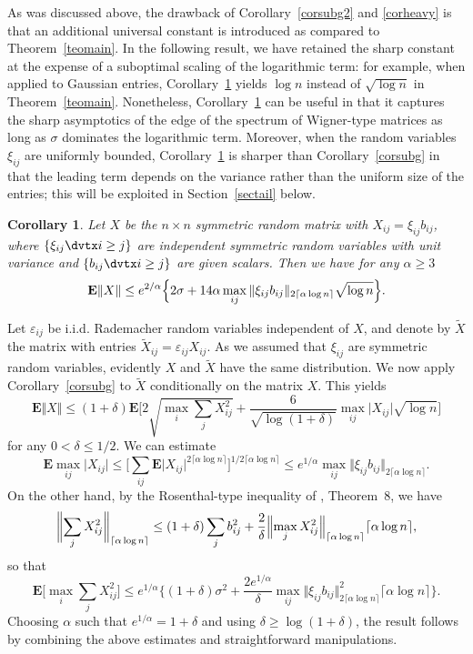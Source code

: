 \documentclass[aop,MSNbibl,dvips]{arximspdf}
\newcommand{\rrvert}{\vert}
\newcommand{\rrVert}{\Vert}
\newcommand{\llvert}{\vert}
\newcommand{\llVert}{\Vert}
\newtheorem{cor}[teo]{Corollary}
\newcommand{\EE}{\mathbf{E}}
\begin{document}
As was discussed above, the drawback of Corollary~\ref{corsubg2} and
\ref{corheavy} is that an additional universal constant is introduced as
compared to Theorem~\ref{teomain}. In the following result, we have
retained the sharp constant at the expense of a suboptimal scaling of the
logarithmic term: for example, when applied to Gaussian entries,
Corollary~\ref{corsymm} yields $\log n$ instead of $\sqrt{\log n}$ in
Theorem~\ref{teomain}. Nonetheless, Corollary~\ref{corsymm} can be
useful in that it captures the sharp asymptotics of the edge of the
spectrum of Wigner-type matrices as long as $\sigma$ dominates the
logarithmic term. Moreover, when the random variables $\xi_{ij}$ are
uniformly bounded, Corollary~\ref{corsymm} is sharper than
Corollary~\ref{corsubg} in that the leading term depends on the
variance rather than the uniform size of the entries; this will be
exploited in Section~\ref{sectail} below.

%
\begin{cor}
\label{corsymm}
Let $X$ be the $n\times n$ symmetric random matrix with
$X_{ij}=\xi_{ij}b_{ij}$, where $\{\xi_{ij}\dvtx i\ge j\}$ are independent
symmetric random variables with unit variance and $\{b_{ij}\dvtx i\ge
j\}$ are
given scalars. Then we have for any $\alpha\ge3$
%
\[
\EE\llVert X\rrVert\le e^{2/\alpha}\Bigl\{2\sigma+ 14\alpha\max
_{ij}\llVert\xi_{ij}b_{ij}\rrVert
_{2\lceil\alpha\log n\rceil} \sqrt{\log n}\Bigr\}. %
\]
%
\end{cor}

\begin{pf}
Let $\varepsilon_{ij}$
be i.i.d. Rademacher random variables independent of $X$, and
denote by $\tilde X$ the matrix with entries $\tilde X_{ij}=
\varepsilon_{ij}X_{ij}$. As we assumed that $\xi_{ij}$ are
symmetric random variables, evidently $X$ and $\tilde X$ have the same
distribution. We now apply Corollary~\ref{corsubg} to
$\tilde X$ conditionally on the matrix $X$. This yields
%
\[
\EE\llVert X\rrVert\le(1+\delta)\EE\biggl[2\sqrt{\max
_i\sum_j X_{ij}^2}
+ \frac{6}{\sqrt{\log(1+\delta)}} \max_{ij}\llvert X_{ij}\rrvert
\sqrt{\log n} \biggr] %
\]
%
for any $0<\delta\le1/2$.
We can estimate
%
\[
\EE\max_{ij}\llvert X_{ij}\rrvert\le\biggl[\sum
_{ij}\EE\llvert X_{ij}\rrvert
^{2\lceil\alpha\log n\rceil} \biggr]^{1/2\lceil\alpha\log n\rceil} \le
e^{1/\alpha} \max
_{ij}\llVert\xi_{ij}b_{ij}\rrVert
_{2\lceil\alpha\log n\rceil}. %
\]
%
On the other hand, by the Rosenthal-type inequality of \cite{BBLM05},
Theorem~8, we have
%
\[
\biggl\llVert\sum_j X_{ij}^2
\biggr\rrVert_{\lceil\alpha\log n\rceil} \le(1+\delta)\sum_{j}b_{ij}^2
+ \frac{2}{\delta} \Bigl\llVert\max_{j}X_{ij}^2
\Bigr\rrVert_{\lceil\alpha\log n\rceil} \lceil\alpha\log n\rceil, %
\]
%
so that
%
\[
\EE\biggl[\max_i\sum_j
X_{ij}^2 \biggr] \le e^{1/\alpha}\biggl\{ (1+\delta)
\sigma^2 + \frac{2e^{1/\alpha}}{\delta} \max_{ij}\llVert
\xi_{ij}b_{ij}\rrVert_{2\lceil\alpha\log n\rceil}^2 \lceil
\alpha\log n\rceil\biggr\}. %
\]
%
Choosing $\alpha$ such that $e^{1/\alpha}=1+\delta$ and
using $\delta\ge\log(1+\delta)$, the result follows by combining
the above
estimates and straightforward manipulations.
\end{pf}
\end{document}
